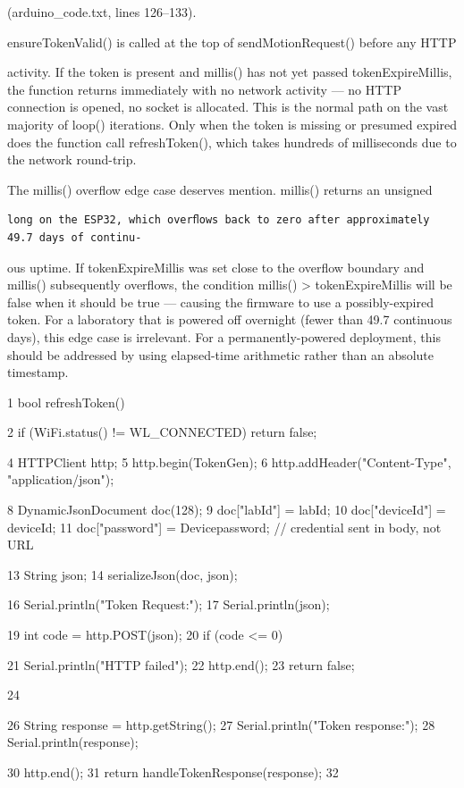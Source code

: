 (arduino\_code.txt, lines 126--133).


ensureTokenValid() is called at the top of sendMotionRequest() before any HTTP



activity. If the token is present and millis() has not yet passed tokenExpireMillis, the
function returns immediately with no network activity --- no HTTP connection is opened,
no socket is allocated. This is the normal path on the vast majority of loop() iterations.
Only when the token is missing or presumed expired does the function call refreshToken(),
which takes hundreds of milliseconds due to the network round-trip.

The millis() overﬂow edge case deserves mention. millis() returns an unsigned
\begin{lstlisting}
long on the ESP32, which overﬂows back to zero after approximately 49.7 days of continu-
\end{lstlisting}

ous uptime. If tokenExpireMillis was set close to the overﬂow boundary and millis()
subsequently overﬂows, the condition millis() > tokenExpireMillis will be false
when it should be true --- causing the ﬁrmware to use a possibly-expired token. For a
laboratory that is powered off overnight (fewer than 49.7 continuous days), this edge case
is irrelevant. For a permanently-powered deployment, this should be addressed by using
elapsed-time arithmetic rather than an absolute timestamp.

1 bool refreshToken() {
2 if (WiFi.status() != WL\_CONNECTED) return false;


4 HTTPClient http;
5 http.begin(TokenGen);
6 http.addHeader("Content-Type", "application/json");


8 DynamicJsonDocument doc(128);
9 doc["labId"] = labId;
10 doc["deviceId"] = deviceId;
11 doc["password"] = Devicepassword; // credential sent in body, not URL


13 String json;
14 serializeJson(doc, json);

16 Serial.println("Token Request:");
17 Serial.println(json);

19 int code = http.POST(json);
20 if (code <= 0) {
21 Serial.println("HTTP failed");
22 http.end();
23 return false;




24 }

26 String response = http.getString();
27 Serial.println("Token response:");
28 Serial.println(response);

30 http.end();
31 return handleTokenResponse(response);
32 }


